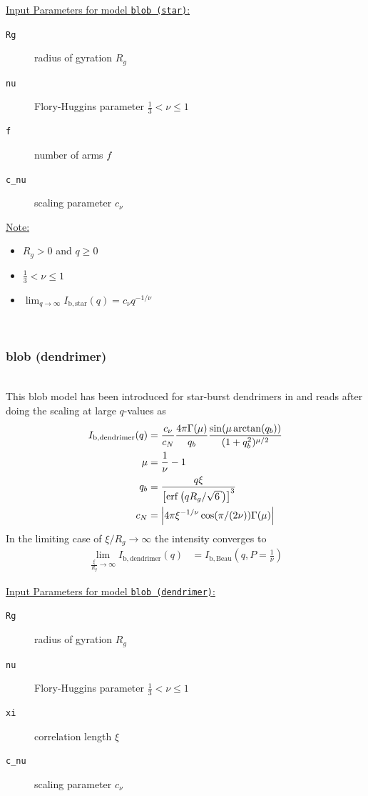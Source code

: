 \vspace{3mm}

\uline{Input Parameters for model \texttt{blob (star)}:}
\begin{description}
\item[\texttt{Rg}] radius of gyration $R_g$
\item[\texttt{nu}] Flory-Huggins parameter $\frac13<\nu\leq 1$
\item[\texttt{f}] number of arms $f$
\item[\texttt{c\_nu}] scaling parameter $c_\nu$
\end{description}

\uline{Note:}
\begin{itemize}
\item $R_g>0$ and $q\geq 0$
\item $\frac13<\nu\leq 1$
\item $\displaystyle \lim_{q\to\infty} I_\mathrm{b,star}(q) = c_{\nu} q^{-1/\nu}$
\end{itemize}


~\\
\subsubsection{blob (dendrimer)}
\label{sect:Blob(dendriner)}
~\\

This blob model has been introduced for star-burst dendrimers in \cite{Rathgeber2002} and reads after doing the scaling at large $q$-values as
\begin{align}\label{eq:blob_dendrimer}
  I_\mathrm{b,dendrimer}(q) &= \frac{c_\nu}{c_N}
  \frac{4 \pi \Gamma(\mu)}{q_b} \frac{\sin(\mu\arctan(q_b))}{(1 + q_b^2)^{\mu/2}} \\
  \mu &= \frac{1}{\nu}-1 \\
  q_b &= \frac{q \xi}{\left[\operatorname{erf}\left(q R_g/\sqrt{6}\right)\right]^3}  \\
  c_N &= \abs{4\pi \xi^{-1/\nu} \cos(\pi/(2\nu))\Gamma(\mu)}
\end{align}
In the limiting case of $\xi/R_g \rightarrow \infty$ the intensity converges to
\begin{align}\label{eq:blob_star_dendrimerLimit}
  \lim_{\frac{\xi}{R_g}\to\infty} I_\mathrm{b,dendrimer}(q) &= I_\mathrm{b,Beau}(q,P=\frac{1}{\nu})
\end{align}

\vspace{3mm}

\uline{Input Parameters for model \texttt{blob (dendrimer)}:}
\begin{description}
\item[\texttt{Rg}] radius of gyration $R_g$
\item[\texttt{nu}] Flory-Huggins parameter $\frac13<\nu\leq 1$
\item[\texttt{xi}] correlation length $\xi$
\item[\texttt{c\_nu}] scaling parameter $c_\nu$
\end{description}

